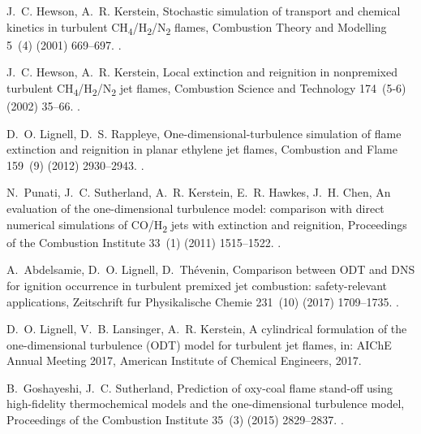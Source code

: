 \documentclass[preprint,12pt, a4paper]{elsarticle}
\begin{document}
\begin{thebibliography}{10}
J.~C. Hewson, A.~R. Kerstein, Stochastic simulation of transport and chemical
  kinetics in turbulent
  {CH}\textsubscript{4}/{H}\textsubscript{2}/{N}\textsubscript{2 }flames,
  Combustion Theory and Modelling 5~(4) (2001) 669--697.
\newblock \href {http://dx.doi.org/10.1088/1364-7830/5/4/309}
  {}.

J.~C. Hewson, A.~R. Kerstein, Local extinction and reignition in nonpremixed
  turbulent {CH}\textsubscript{4}/{H}\textsubscript{2}/{N}\textsubscript{2} jet
  flames, Combustion Science and Technology 174~(5-6) (2002) 35--66.
\newblock \href {http://dx.doi.org/10.1080/713713031}
  {}.

D.~O. Lignell, D.~S. Rappleye, One-dimensional-turbulence simulation of flame
  extinction and reignition in planar ethylene jet flames, Combustion and Flame
  159~(9) (2012) 2930--2943.
\newblock \href {http://dx.doi.org/10.1016/j.combustflame.2012.03.018}
  {}.

N.~Punati, J.~C. Sutherland, A.~R. Kerstein, E.~R. Hawkes, J.~H. Chen, An
  evaluation of the one-dimensional turbulence model: comparison with direct
  numerical simulations of {CO}/{H}\textsubscript{2 }jets with extinction and
  reignition, Proceedings of the Combustion Institute 33~(1) (2011) 1515--1522.
\newblock \href {http://dx.doi.org/10.1016/j.proci.2010.06.127}
  {}.

A.~Abdelsamie, D.~O. Lignell, D.~Th{\'e}venin, Comparison between {ODT} and
  {DNS} for ignition occurrence in turbulent premixed jet combustion:
  safety-relevant applications, Zeitschrift fur Physikalische Chemie 231~(10)
  (2017) 1709--1735.
\newblock \href {http://dx.doi.org/10.1515/zpch-2016-0902}
  {}.

D.~O. Lignell, V.~B. Lansinger, A.~R. Kerstein, A cylindrical formulation of
  the one-dimensional turbulence ({ODT}) model for turbulent jet flames, in:
  AIChE Annual Meeting 2017, {American Institute of Chemical Engineers}, 2017.

B.~Goshayeshi, J.~C. Sutherland, Prediction of oxy-coal flame stand-off using
  high-fidelity thermochemical models and the one-dimensional turbulence model,
  Proceedings of the Combustion Institute 35~(3) (2015) 2829--2837.
\newblock \href {http://dx.doi.org/10.1016/j.proci.2014.07.003}
  {}.


\end{thebibliography}
\end{document}
